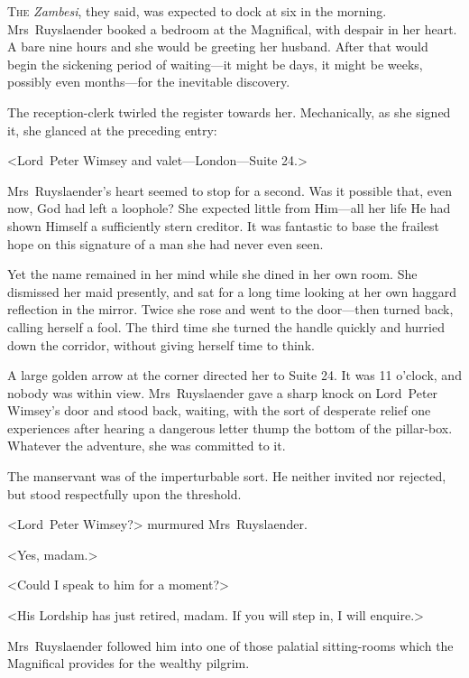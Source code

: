 
\lettrine[lines=4]{T}{he} \textit{Zambesi}, they said, was expected to dock at six in the morning. Mrs~Ruyslaender booked a bedroom at the Magnifical, with despair in her heart. A bare nine hours and she would be greeting her husband. After that would begin the sickening period of waiting—it might be days, it might be weeks, possibly even months—for the inevitable discovery.

The reception-clerk twirled the register towards her. Mechanically, as she signed it, she glanced at the preceding entry:

<Lord~Peter Wimsey and valet—London—Suite 24.>

Mrs~Ruyslaender's heart seemed to stop for a second. Was it possible that, even now, God had left a loophole? She expected little from Him—all her life He had shown Himself a sufficiently stern creditor. It was fantastic to base the frailest hope on this signature of a man she had never even seen.

Yet the name remained in her mind while she dined in her own room. She dismissed her maid presently, and sat for a long time looking at her own haggard reflection in the mirror. Twice she rose and went to the door—then turned back, calling herself a fool. The third time she turned the handle quickly and hurried down the corridor, without giving herself time to think.

A large golden arrow at the corner directed her to Suite 24. It was 11 o'clock, and nobody was within view. Mrs~Ruyslaender gave a sharp knock on Lord~Peter Wimsey's door and stood back, waiting, with the sort of desperate relief one experiences after hearing a dangerous letter thump the bottom of the pillar-box. Whatever the adventure, she was committed to it.

The manservant was of the imperturbable sort. He neither invited nor rejected, but stood respectfully upon the threshold.

<Lord~Peter Wimsey?> murmured Mrs~Ruyslaender.

<Yes, madam.>

<Could I speak to him for a moment?>

<His Lordship has just retired, madam. If you will step in, I will enquire.>

Mrs~Ruyslaender followed him into one of those palatial sitting-rooms which the Magnifical provides for the wealthy pilgrim.


